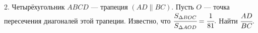 2. Четырёхугольник $ABCD$ --- трапеция $(AD\parallel BC).$ Пусть $O$ --- точка пересечения диагоналей этой трапеции. Известно, что $\cfrac{S_{\Delta BOC}}{S_{\Delta AOD}}=\cfrac{1}{81}.$ Найти $\cfrac{AD}{BC}.$\\
